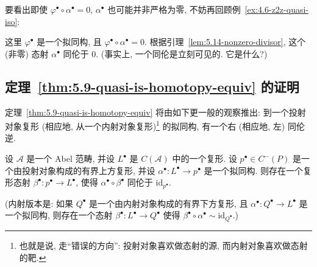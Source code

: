 \begin{example}\label{ex:5.15-not-zero-on-nose}
要看出即使 $\varphi^\bullet\circ\alpha^\bullet=0$, $\alpha^\bullet$ 也可能并非严格为零, 不妨再回顾例~\ref{ex:4.6-z2z-quasi-iso}:
\begin{center}
\end{center}
这里 $\varphi^\bullet$ 是一个拟同构, 且 $\varphi^\bullet\circ\alpha^\bullet=0$. 根据引理~\ref{lem:5.14-nonzero-divisor}, 这个 (非零) 态射 $\alpha^\bullet$ 同伦于 $0$. (事实上, 一个同伦是立刻可见的. 它是什么?)
\end{example}

\subsection{定理~\ref{thm:5.9-quasi-is-homotopy-equiv} 的证明}
\label{subsec:5.5-proof}

定理~\ref{thm:5.9-quasi-is-homotopy-equiv} 将由如下更一般的观察推出: 到一个投射对象复形 (相应地, 从一个内射对象复形)\footnote{也就是说, 走``错误的方向'': 投射对象喜欢做态射的源, 而内射对象喜欢做态射的靶.} 的拟同构, 有一个右 (相应地, 左) 同伦逆.

\begin{proposition}\label{prop:5.16-homotopy-inverse}
设 $\mathcal{A}$ 是一个 Abel 范畴, 并设 $L^\bullet$ 是 $C(\mathcal{A})$ 中的一个复形. 设 $p^\bullet\in C^-(P)$ 是一个由投射对象构成的有界上方复形, 并设 $\alpha^\bullet:L^\bullet\to p^\bullet$ 是一个拟同构. 则存在一个复形态射 $\beta^\bullet:p^\bullet\to L^\bullet$, 使得 $\alpha^\bullet\circ\beta^\bullet$ 同伦于 $\mathrm{id}_{p^\bullet}$.
\end{proposition}

\indent (内射版本是: 如果 $Q^\bullet$ 是一个由内射对象构成的有界下方复形, 且 $\alpha^\bullet:Q^\bullet\to L^\bullet$ 是一个拟同构, 则存在一个态射 $\beta^\bullet:L^\bullet\to Q^\bullet$ 使得 $\beta^\bullet\circ\alpha^\bullet\sim\mathrm{id}_{Q^\bullet}$.)

